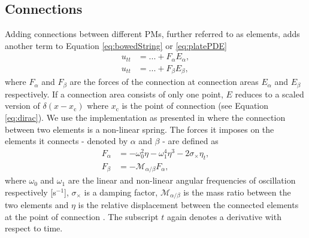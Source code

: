 \documentclass{article}
\begin{document}
\subsection{Connections}\label{sec:connections}
Adding connections between different PMs, further referred to as elements, adds another term to Equation \eqref{eq:bowedString} or \eqref{eq:platePDE}
\begin{equation}
\begin{aligned}
    u_{tt} &= ... + F_\alpha E_\alpha, \\
    u_{tt} &= ... + F_\beta E_\beta,
\end{aligned}
\end{equation}
where $F_\alpha$ and $F_\beta$ are the forces of the connection at connection areas $E_\alpha$ and $E_\beta$ respectively. If a connection area consists of only one point, $E$ reduces to a scaled version of $\delta(x-x_\text{c})$ where $x_\text{c}$ is the point of connection (see Equation \eqref{eq:dirac}). We use the implementation as presented in \cite{Bilbao2009:ModularPercussion} where the connection between two elements is a non-linear spring. The forces it imposes on the elements it connects - denoted by $\alpha$ and $\beta$ - are defined as
\begin{subequations}\label{eq:connectionsPDE}
\begin{align}
    F_\alpha &= -\omega_0^2\eta - \omega_1^4\eta^3 - 2\sigma_\times\eta_t,\\
    F_\beta &= -\mathcal{M}_{\alpha/\beta}F_\alpha,
\end{align}
\end{subequations}
where $\omega_0$ and $\omega_1$ are the linear and non-linear angular frequencies of oscillation respectively [s$^{-1}$], $\sigma_\times$ is a damping factor, $\mathcal{M}_{\alpha/\beta}$ is the mass ratio between the two elements and $\eta$ is the relative displacement between the connected elements at the point of connection %
. The subscript $t$ again denotes a derivative with respect to time.
\end{document}
